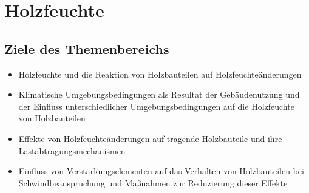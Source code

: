 \documentclass[fleqn,twoside]{article}
\begin{document}
\newpage
\section{Holzfeuchte}
    
    \subsection{Ziele des Themenbereichs}
        \begin{itemize}
            \item Holzfeuchte und die Reaktion von Holzbauteilen auf Holzfeuchteänderungen
            \item Klimatische Umgebungsbedingungen als Resultat der Gebäudenutzung und der Einfluss unterschiedlicher Umgebungsbedingungen auf die Holzfeuchte von Holzbauteilen
            \item Effekte von Holzfeuchteänderungen auf tragende Holzbauteile und ihre Lastabtragungsmechanismen
            \item Einfluss von Verstärkungselementen auf das Verhalten von Holzbauteilen bei Schwindbeanspruchung und Maßnahmen zur Reduzierung dieser Effekte
        \end{itemize}
\end{document}
